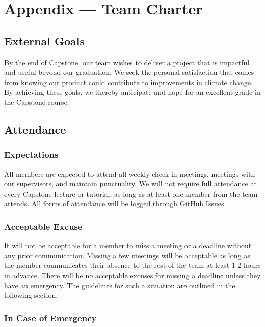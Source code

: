 \documentclass{article}
\begin{document}
\newpage{}

\section*{Appendix --- Team Charter}


\subsection*{External Goals}

By the end of Capstone, our team wishes to deliver a project that is impactful
and useful beyond our graduation. We seek the personal satisfaction that comes from
knowing our product could contribute to improvements in climate change. By achieving 
these goals, we thereby anticipate and hope for an excellent grade in the Capstone
course.

\subsection*{Attendance}

\subsubsection*{Expectations}

All members are expected to attend all weekly check-in meetings, meetings with our
supervisors, and maintain punctuality. We will not require full attendance at every
Capstone lecture or tutorial, as long as at least one member from the team attends.
All forms of attendance will be logged through GitHub Issues.

\subsubsection*{Acceptable Excuse}

It will not be acceptable for a member to miss a meeting or a deadline without any
prior communication. Missing a few meetings will be acceptable as long as the member
communicates their absence to the rest of the team at least 1-2 hours in advance.
There will be no acceptable excuses for missing a deadline unless they have an 
emergency. The guidelines for such a situation are outlined in the following section.

\subsubsection*{In Case of Emergency}
\end{document}
